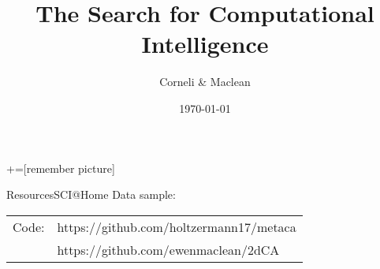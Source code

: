 \documentclass[12 pt]{beamer}
\author[Corneli \& Maclean \quad {j.corneli@gold.ac.uk}]{Corneli \& Maclean}
\title[The Search for Computational Intelligence]{The Search for Computational Intelligence}
\institute{Goldsmiths College / University of Edinburgh}
\date{\today}
\begin{document}

+=[remember picture]








\begin{frame}{Resources}{SCI@Home}
Data sample:


\begin{tabular}{ll}
Code: &https://github.com/holtzermann17/metaca\\
&https://github.com/ewenmaclean/2dCA
\end{tabular}
\end{frame}
\end{document}
